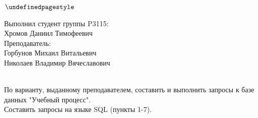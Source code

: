 \documentclass[12pt]{article}
\begin{document}
\pagestyle{fancy}
$\thispagestyle{first style}$


\vspace{25mm}


\vspace{50mm}

\begin{flushright}
Выполнил студент группы P3115:\\Хромов Даниил Тимофеевич\\
\vspace{5mm}
Преподаватель:\\Горбунов Михаил Витальевич\\Николаев Владимир Вячеславович
\end{flushright}

\newpage

\pagestyle{empty}
\\
По варианту, выданному преподавателем, составить и выполнить запросы к базе данных "Учебный процесс".\\\vspace{5mm}
Составить запросы на языке SQL (пункты 1-7).
\end{document}
